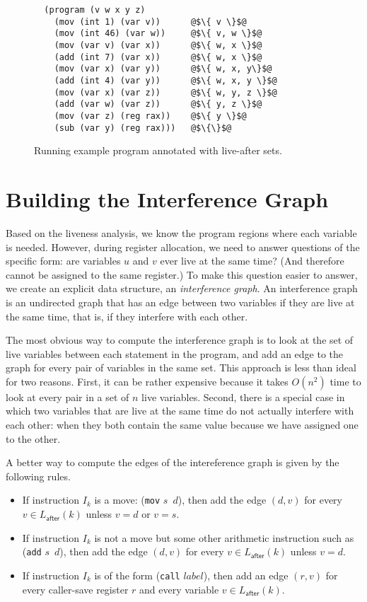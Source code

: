 \documentclass[12pt]{book}
\newcommand{\key}[1]{\texttt{#1}}
\begin{document}
\begin{figure}[tbp]
\begin{lstlisting}
  (program (v w x y z)
    (mov (int 1) (var v))      @$\{ v \}$@
    (mov (int 46) (var w))     @$\{ v, w \}$@
    (mov (var v) (var x))      @$\{ w, x \}$@
    (add (int 7) (var x))      @$\{ w, x \}$@
    (mov (var x) (var y))      @$\{ w, x, y\}$@
    (add (int 4) (var y))      @$\{ w, x, y \}$@
    (mov (var x) (var z))      @$\{ w, y, z \}$@
    (add (var w) (var z))      @$\{ y, z \}$@
    (mov (var z) (reg rax))    @$\{ y \}$@
    (sub (var y) (reg rax)))   @$\{\}$@
\end{lstlisting}
\caption{Running example program annotated with live-after sets.}
\label{fig:live-eg}
\end{figure}


\section{Building the Interference Graph}

Based on the liveness analysis, we know the program regions where each
variable is needed.  However, during register allocation, we need to
answer questions of the specific form: are variables $u$ and $v$ ever
live at the same time?  (And therefore cannot be assigned to the same
register.)  To make this question easier to answer, we create an
explicit data structure, an \emph{interference graph}.  An
interference graph is an undirected graph that has an edge between two
variables if they are live at the same time, that is, if they
interfere with each other.

The most obvious way to compute the interference graph is to look at
the set of live variables between each statement in the program, and
add an edge to the graph for every pair of variables in the same set.
This approach is less than ideal for two reasons. First, it can be
rather expensive because it takes $O(n^2)$ time to look at every pair
in a set of $n$ live variables. Second, there is a special case in
which two variables that are live at the same time do not actually
interfere with each other: when they both contain the same value
because we have assigned one to the other.

A better way to compute the edges of the intereference graph is given
by the following rules.

\begin{itemize}
\item If instruction $I_k$ is a move: (\key{mov} $s$\, $d$), then add
  the edge $(d,v)$ for every $v \in L_{\mathsf{after}}(k)$ unless $v =
  d$ or $v = s$.

\item If instruction $I_k$ is not a move but some other arithmetic
  instruction such as (\key{add} $s$\, $d$), then add the edge $(d,v)$
  for every $v \in L_{\mathsf{after}}(k)$ unless $v = d$.
  
\item If instruction $I_k$ is of the form (\key{call}
  $\mathit{label}$), then add an edge $(r,v)$ for every caller-save
  register $r$ and every variable $v \in L_{\mathsf{after}}(k)$.
\end{itemize}
\end{document}
